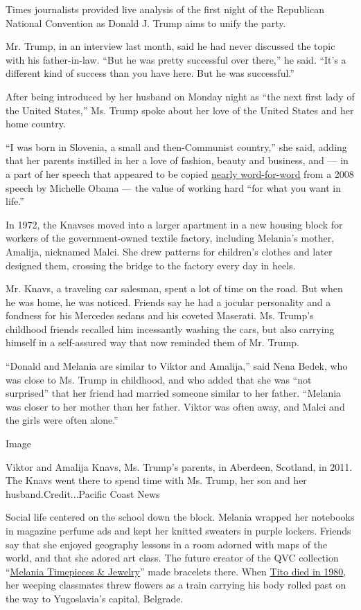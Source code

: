 Times journalists provided live analysis of the first night of the
Republican National Convention as Donald J. Trump aims to unify the
party.

Mr. Trump, in an interview last month, said he had never discussed the
topic with his father-in-law. ``But he was pretty successful over
there,'' he said. ``It's a different kind of success than you have here.
But he was successful.''

After being introduced by her husband on Monday night as ``the next
first lady of the United States,'' Ms. Trump spoke about her love of the
United States and her home country.

``I was born in Slovenia, a small and then-Communist country,'' she
said, adding that her parents instilled in her a love of fashion, beauty
and business, and --- in a part of her speech that appeared to be copied
\href{https://twitter.com/JarrettHill/status/755242423991709697}{nearly
word-for-word} from a 2008 speech by Michelle Obama --- the value of
working hard ``for what you want in life.''

In 1972, the Knavses moved into a larger apartment in a new housing
block for workers of the government-owned textile factory, including
Melania's mother, Amalija, nicknamed Malci. She drew patterns for
children's clothes and later designed them, crossing the bridge to the
factory every day in heels.

Mr. Knavs, a traveling car salesman, spent a lot of time on the road.
But when he was home, he was noticed. Friends say he had a jocular
personality and a fondness for his Mercedes sedans and his coveted
Maserati. Ms. Trump's childhood friends recalled him incessantly washing
the cars, but also carrying himself in a self-assured way that now
reminded them of Mr. Trump.

``Donald and Melania are similar to Viktor and Amalija,'' said Nena
Bedek, who was close to Ms. Trump in childhood, and who added that she
was ``not surprised'' that her friend had married someone similar to her
father. ``Melania was closer to her mother than her father. Viktor was
often away, and Malci and the girls were often alone.''

Image

Viktor and Amalija Knavs, Ms. Trump's parents, in Aberdeen, Scotland, in
2011. The Knavs went there to spend time with Ms. Trump, her son and her
husband.Credit...Pacific Coast News

Social life centered on the school down the block. Melania wrapped her
notebooks in magazine perfume ads and kept her knitted sweaters in
purple lockers. Friends say that she enjoyed geography lessons in a room
adorned with maps of the world, and that she adored art class. The
future creator of the QVC collection
``\href{https://www.youtube.com/watch?v=ID0KKalefqw}{Melania Timepieces
\& Jewelry}'' made bracelets there. When
\href{http://nyti.ms/29OUbBu}{Tito died in 1980}, her weeping classmates
threw flowers as a train carrying his body rolled past on the way to
Yugoslavia's capital, Belgrade.

